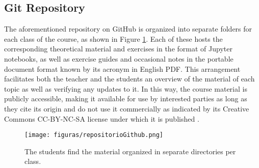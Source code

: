 

\subsection{Git Repository}
The aforementioned repository on GitHub is organized into separate folders for each class of the course, as shown in Figure \ref{fig:github}.
Each of these hosts the corresponding theoretical material and exercises in the format of Jupyter notebooks, as well as exercise guides and occasional notes in the portable document format known by its acronym in English PDF.
This arrangement facilitates both the teacher and the students an overview of the material of each topic as well as verifying any updates to it.
In this way, the course material is publicly accessible, making it available for use by interested parties \cite{repositorio-victor} as long as they cite its origin and do not use it commercially as indicated by its Creative Commons CC-BY-NC-SA license under which it is published \cite{creative}.

\begin{figure}[!ht]
\centering
\texttt{[image: figuras/repositorioGithub.png]}
\caption{The students find the material organized in separate directories per class.}
\label{fig:github}
\end{figure}





